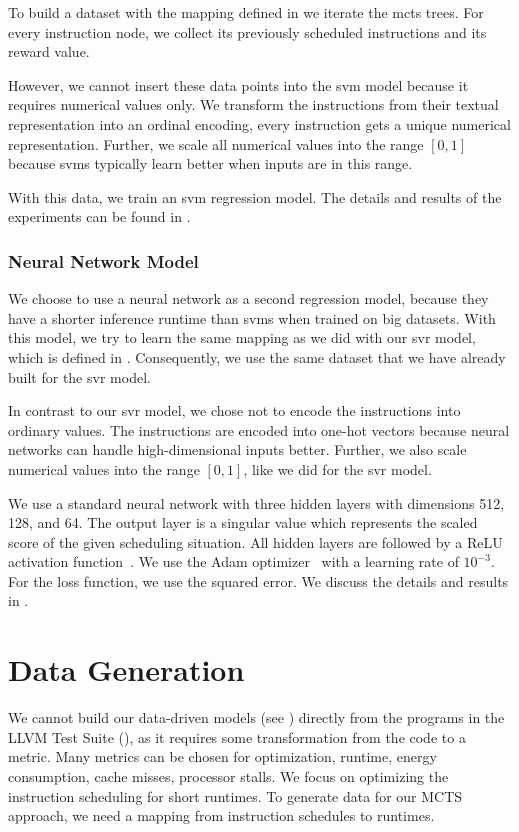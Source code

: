 To build a dataset with the mapping defined in  we iterate the \ac{mcts} trees.
For every instruction node, we collect its previously scheduled instructions and its reward value.

However, we cannot insert these data points into the \ac{svm} model because it requires numerical values only.
We transform the instructions from their textual representation into an ordinal encoding, \ie every instruction gets a unique numerical representation.
Further, we scale all numerical values into the range $[0,1]$ because \acp{svm} typically learn better when inputs are in this range.

With this data, we train an \ac{svm} regression model.
The details and results of the experiments can be found in .

\subsubsection{Neural Network Model}
We choose to use a neural network as a second regression model, because they have a shorter inference runtime than \acp{svm} when trained on big datasets.
With this model, we try to learn the same mapping as we did with our \ac{svr} model, which is defined in .
Consequently, we use the same dataset that we have already built for the \ac{svr} model.

In contrast to our \ac{svr} model, we chose not to encode the instructions into ordinary values.
The instructions are encoded into one-hot vectors because neural networks can handle high-dimensional inputs better.
Further, we also scale numerical values into the range $[0,1]$, like we did for the \ac{svr} model.

We use a standard neural network with three hidden layers with dimensions 512, 128, and 64.
The output layer is a singular value which represents the scaled score of the given scheduling situation.
All hidden layers are followed by a ReLU activation function~\cite{nair2010rectified}.
We use the Adam optimizer~\cite{kingma2014adam} with a learning rate of $10^{-3}$.
For the loss function, we use the squared error.
We discuss the details and results in .

\section{Data Generation}
\label{sec:approach:data-generation}
We cannot build our data-driven models (see ) directly from the programs in the LLVM Test Suite (), as it requires some transformation from the code to a metric.
Many metrics can be chosen for optimization, \eg runtime, energy consumption, cache misses, processor stalls.
We focus on optimizing the instruction scheduling for short runtimes.
To generate data for our MCTS approach, we need a mapping from instruction schedules to runtimes.

